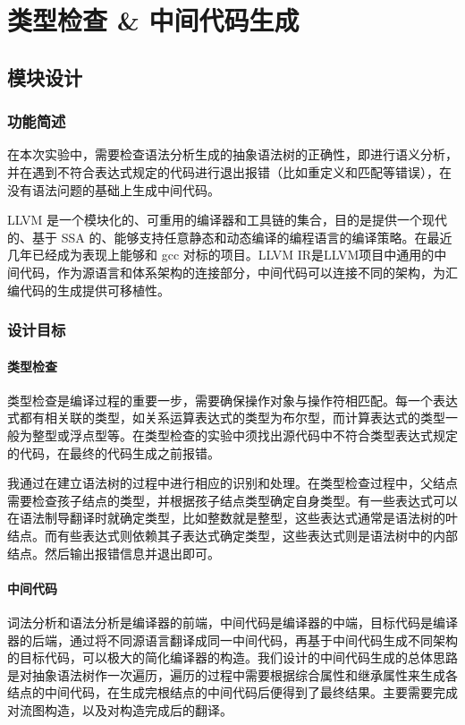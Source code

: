 \documentclass[UTF8,a4paper,10pt]{ctexart}
\begin{document}
\section{类型检查 \& 中间代码生成}
\subsection{模块设计}
\subsubsection{功能简述}
在本次实验中，需要检查语法分析生成的抽象语法树的正确性，即进行语义分析，并在遇到不符合表达式规定的代码进行退出报错（比如重定义和匹配等错误），在没有语法问题的基础上生成中间代码。

LLVM 是一个模块化的、可重用的编译器和工具链的集合，目的是提供一个现代的、基于 SSA 的、能够支持任意静态和动态编译的编程语言的编译策略。在最近几年已经成为表现上能够和 gcc 对标的项目。LLVM IR是LLVM项目中通用的中间代码，作为源语言和体系架构的连接部分，中间代码可以连接不同的架构，为汇编代码的生成提供可移植性。
\subsubsection{设计目标}
\paragraph{类型检查}
类型检查是编译过程的重要一步，需要确保操作对象与操作符相匹配。每一个表达式都有相关联的类型，如关系运算表达式的类型为布尔型，而计算表达式的类型一般为整型或浮点型等。在类型检查的实验中须找出源代码中不符合类型表达式规定的代码，在最终的代码生成之前报错。

我通过在建立语法树的过程中进行相应的识别和处理。在类型检查过程中，父结点需要检查孩子结点的类型，并根据孩子结点类型确定自身类型。有一些表达式可以在语法制导翻译时就确定类型，比如整数就是整型，这些表达式通常是语法树的叶结点。而有些表达式则依赖其子表达式确定类型，这些表达式则是语法树中的内部结点。然后输出报错信息并退出即可。
\paragraph{中间代码}
词法分析和语法分析是编译器的前端，中间代码是编译器的中端，目标代码是编译器的后端，通过将不同源语言翻译成同一中间代码，再基于中间代码生成不同架构的目标代码，可以极大的简化编译器的构造。我们设计的中间代码生成的总体思路是对抽象语法树作一次遍历，遍历的过程中需要根据综合属性和继承属性来生成各结点的中间代码，在生成完根结点的中间代码后便得到了最终结果。主要需要完成对流图构造，以及对构造完成后的翻译。
\end{document}
